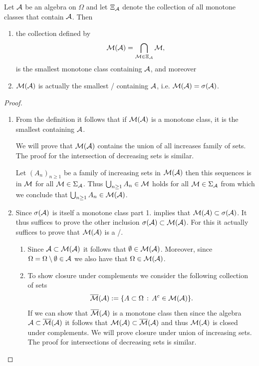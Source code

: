 \begin{theorem}\label{thm:monotone_class}
Let $\mathcal A$ be an algebra on $\Omega$ and let $\Xi_{\mathcal A}$ denote the collection of all monotone classes that contain $\mathcal A$. Then 
\begin{enumerate}
\item the collection defined by
\[
	\mathcal M(\mathcal A) = \bigcap_{\mathcal M \in \Xi_{\mathcal A}} \mathcal M,
\]
is the smallest monotone class containing $\mathcal A$, and moreover
\item $\mathcal M(\mathcal A)$ is actually the smallest \sigalg/ containing $\mathcal A$, i.e. $\mathcal M(\mathcal A) = \sigma(\mathcal A)$.
\end{enumerate}
\end{theorem}

\begin{proof}
\hfill
\begin{enumerate}
\item From the definition it follows that if $\mathcal M(\mathcal A)$ is a monotone class, it is the smallest containing $\mathcal A$.

We will prove that $\mathcal M(\mathcal A)$ contains the union of all increases family of sets. The proof for the intersection of decreasing sets is similar.

Let $(A_n)_{n \ge 1}$ be a family of increasing sets in $\mathcal M(\mathcal A)$ then this sequences is in $\mathcal M$ for all $\mathcal M \in \Sigma_{\mathcal A}$. Thus $\bigcup_{n \ge 1} A_n \in \mathcal M$ holds for all $\mathcal M \in \Sigma_{\mathcal A}$ from which we conclude that $\bigcup_{n \ge 1} A_n \in \mathcal M(\mathcal A)$.
\item Since $\sigma(\mathcal A)$ is itself a monotone class part 1. implies that $\mathcal M(\mathcal A) \subset \sigma(\mathcal A)$. It thus suffices to prove the other inclusion $\sigma(\mathcal A) \subset \mathcal M(\mathcal A)$. For this it actually suffices to prove that $\mathcal M(\mathcal A)$ is a \sigalg/.

\begin{enumerate}[label=\arabic*.]
\item Since $\mathcal A \subset \mathcal M(\mathcal A)$ it follows that $\emptyset \in \mathcal M(\mathcal A)$. Moreover, since $\Omega = \Omega \setminus \emptyset \in \mathcal A$ we also have that $\Omega \in \mathcal M(\mathcal A)$.
\item To show closure under complements we consider the following collection of sets
\[
	\overline{\mathcal M}(\mathcal A) := \{A \subset \Omega \, : \, A^c \in \mathcal M(\mathcal A)\}.
\]
If we can show that $\overline{\mathcal M}(\mathcal A)$ is a monotone class then since the algebra $\mathcal A \subset \overline{\mathcal M}(\mathcal A)$ it follows that $\mathcal M(\mathcal A) \subset \overline{\mathcal M}(\mathcal A)$ and thus $\mathcal M(\mathcal A)$ is closed under complements. We will prove closure under union of increasing sets. The proof for intersections of decreasing sets is similar.


\end{enumerate}
\end{enumerate}
\end{proof}
